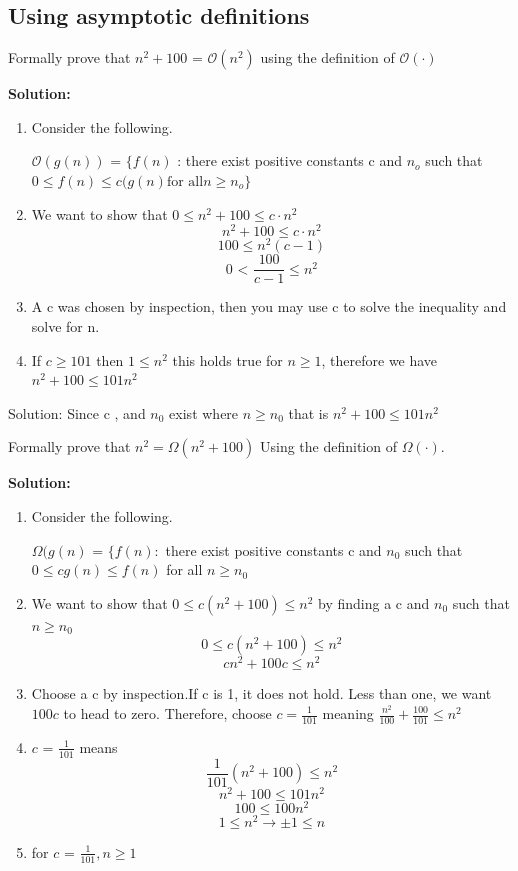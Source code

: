 \documentclass[11pt,fleqn]{book}
\begin{document}
\subsection{Using asymptotic definitions}
\begin{example}
Formally prove that $n^2+ 100 \text{ = }\mathcal{O}(n^2)$ using the definition of $\mathcal{O}(\cdot)$
\end{example}
\textbf{Solution:}
\begin{enumerate}
    \item Consider the following. \\
    \begin{definition}
     $\mathcal{O}(g(n))$ = $\{f(n)$ : there exist positive constants c and  $n_o$ such that\\ $
    0 \leq f(n) \leq c(g(n) \text{for all} n \geq n_o\}$
    \end{definition}
    \item We want to show that $0 \leq n^2 + 100 \leq c\cdot n^2$
    $$n^2 + 100 \leq c\cdot n^2$$
    $$100 \leq n^2(c - 1) $$
    $$0 \text{ < } \frac{100}{c - 1} \leq n^2$$
    \item A c was chosen by inspection, then you may use c to solve the inequality and solve for n. 
    \item If $c \geq 101 $ then $1 \leq n^2$ this holds true for $n \geq 1$, therefore we have $n^2 + 100 \leq 101n^2$
\end{enumerate} 
    \color{blue}Solution:  Since  c , and $n_0$ exist where  $n \geq n_0$ that is $n^2 + 100 \leq 101n^2 $\color{black}
\begin{example}
Formally prove that $n^2= \Omega(n^2+ 100)$ Using the definition of $\Omega(\cdot)$.
\end{example}
\textbf{Solution: } 
\begin{enumerate}
    \item Consider the following. \\
    \begin{definition}
    $\Omega(g(n) \text{ = } \{f(n) : $ there exist positive constants c and $n_0$ such that $0 \leq cg(n) \leq f(n)$ for all $n \geq n_0$
    \end{definition}
    \item We want to show that $0 \leq c(n^2 + 100) \leq n^2$ by finding a c and $n_0$ such that $n \geq n_0$
    $$0 \leq c(n^2 + 100) \leq n^2$$
    $$cn^2 + 100c \leq n^2$$
    \item Choose a c by inspection.If c is 1, it does not hold. Less than one, we want $100c$ to head to zero. Therefore, choose $ c= \frac{1}{101}$ meaning $\frac{n^2}{100} + \frac{100}{101} \leq n^2 $
    \item $c \text{ = }  \frac{1}{101}$ means $$\frac{1}{101}(n^2 + 100) \leq n^2$$
     $$n^2 + 100 \leq 101n^2$$
     $$100 \leq  100n^2$$
     $$1 \leq  n^2 \rightarrow \pm 1 \leq n$$
     \item for $c \text{ = }  \frac{1}{101}, n \geq 1 $
\end{enumerate}
\end{document}
